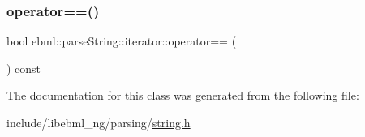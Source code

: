 \mbox{\label{classebml_1_1parseString_1_1iterator_a6dd6eff768ec3385b2981d6861834056}} 
\subsubsection{\texorpdfstring{operator==()}{operator==()}}
{\footnotesize\ttfamily bool ebml\+::parse\+String\+::iterator\+::operator== (\begin{DoxyParamCaption}\item[{const \mbox{\hyperlink{classebml_1_1parseString_1_1iterator}{parse\+String\+::iterator}} \&}]{ }\end{DoxyParamCaption}) const}



The documentation for this class was generated from the following file\+:\begin{DoxyCompactItemize}
\item 
include/libebml\+\_\+ng/parsing/\mbox{\hyperlink{string_8h}{string.\+h}}\end{DoxyCompactItemize}
